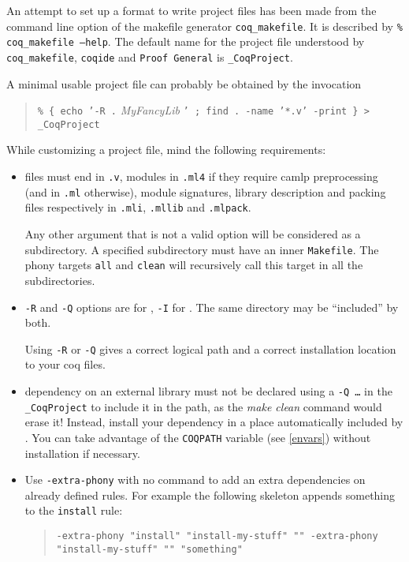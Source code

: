 An attempt to set up a format to write project files has been made
from the command line option of the {\Coq} makefile generator
\texttt{coq\_makefile}. It is described by \texttt{\% coq\_makefile
  --help}. The default name for the project file understood by
\texttt{coq\_makefile}, \texttt{coqide} and \texttt{Proof General} is
\texttt{\_CoqProject}.

A minimal usable project file can probably be obtained by the
invocation
\begin{quotation}
\texttt{\% \{ echo '-R .} \textit{MyFancyLib} \texttt{' ; find . -name
  '*.v' -print \} > \_CoqProject}
\end{quotation}

While customizing a project file, mind the following requirements:
\begin{itemize}
\item {\Coq} files must end in \texttt{.v}, {\ocaml} modules in
  \texttt{.ml4} if they require camlp preprocessing (and in
  \texttt{.ml} otherwise), {\ocaml} module signatures, library
  description and packing files respectively in \texttt{.mli},
  \texttt{.mllib} and \texttt{.mlpack}.

Any other argument that is not a valid option will be considered as a
subdirectory. A specified subdirectory must have an inner
\texttt{Makefile}. The phony targets \texttt{all} and \texttt{clean}
will recursively call this target in all the subdirectories.

\item \texttt{-R} and \texttt{-Q} options are for {\Coq}, \texttt{-I}
  for {\ocaml}. The same directory may be ``included'' by both.

  Using \texttt{-R} or \texttt{-Q} gives a correct logical path
  and a correct installation location to your coq files.
\item dependency on an external library must not be declared using a
  \texttt{-Q \dots} in the \texttt{\_CoqProject} to include it in the
  path, as the \textit{make clean} command would erase it! Instead,
  install your dependency in a place automatically included by
  {\Coq}. You can take advantage of the \texttt{COQPATH} variable
  (see \ref{envars}) without installation if necessary.
\item Use \texttt{-extra-phony} with no command to add an extra
  dependencies on already defined rules. For example the following
  skeleton appends something to the \texttt{install} rule:
\begin{quotation}
\texttt{-extra-phony "install" "install-my-stuff" ""
  -extra-phony "install-my-stuff" "" "something"}
\end{quotation}
\end{itemize}

